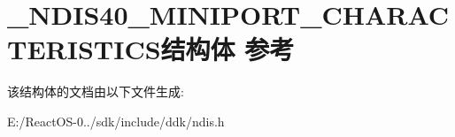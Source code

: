 \hypertarget{struct___n_d_i_s40___m_i_n_i_p_o_r_t___c_h_a_r_a_c_t_e_r_i_s_t_i_c_s}{}\section{\+\_\+\+N\+D\+I\+S40\+\_\+\+M\+I\+N\+I\+P\+O\+R\+T\+\_\+\+C\+H\+A\+R\+A\+C\+T\+E\+R\+I\+S\+T\+I\+C\+S结构体 参考}
\label{struct___n_d_i_s40___m_i_n_i_p_o_r_t___c_h_a_r_a_c_t_e_r_i_s_t_i_c_s}


该结构体的文档由以下文件生成\+:\begin{DoxyCompactItemize}
\item 
E\+:/\+React\+O\+S-\/0../sdk/include/ddk/ndis.\+h\end{DoxyCompactItemize}
